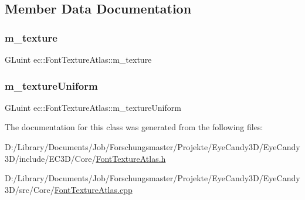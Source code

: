 \subsection{Member Data Documentation}
\mbox{\label{classec_1_1_font_texture_atlas_a97620bab980c2f73e90928c1c9ec405a}} 
\subsubsection{\texorpdfstring{m\+\_\+texture}{m\_texture}}
{\footnotesize\ttfamily G\+Luint ec\+::\+Font\+Texture\+Atlas\+::m\+\_\+texture}

\mbox{\label{classec_1_1_font_texture_atlas_a0ad591b30c2e288d31f4ab9e18acb887}} 
\subsubsection{\texorpdfstring{m\+\_\+texture\+Uniform}{m\_textureUniform}}
{\footnotesize\ttfamily G\+Luint ec\+::\+Font\+Texture\+Atlas\+::m\+\_\+texture\+Uniform}



The documentation for this class was generated from the following files\+:\begin{DoxyCompactItemize}
\item 
D\+:/\+Library/\+Documents/\+Job/\+Forschungsmaster/\+Projekte/\+Eye\+Candy3\+D/\+Eye\+Candy3\+D/include/\+E\+C3\+D/\+Core/\mbox{\hyperlink{_font_texture_atlas_8h}{Font\+Texture\+Atlas.\+h}}\item 
D\+:/\+Library/\+Documents/\+Job/\+Forschungsmaster/\+Projekte/\+Eye\+Candy3\+D/\+Eye\+Candy3\+D/src/\+Core/\mbox{\hyperlink{_font_texture_atlas_8cpp}{Font\+Texture\+Atlas.\+cpp}}\end{DoxyCompactItemize}
